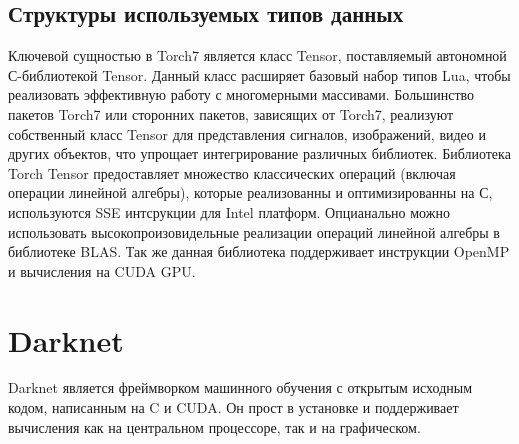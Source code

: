\documentclass[a4paper,english,russian]{G2-105}
\begin{document}
\subsection{Структуры используемых типов данных}
\par Ключевой сущностью в Torch7 является класс Tensor, поставляемый автономной С-библиотекой Tensor. Данный класс расширяет базовый набор типов Lua, чтобы реализовать эффективную работу с многомерными массивами. Большинство пакетов Torch7 или сторонних пакетов, зависящих от Torch7, реализуют собственный класс Tensor для представления сигналов, изображений, видео и других объектов, что упрощает интегрирование различных библиотек. Библиотека Torch Tensor предоставляет множество классических операций (включая операции линейной алгебры), которые реализованны и оптимизированны на С, используются SSE интсрукции для Intel платформ. Опцианально можно использовать высокопроизовидельные реализации операций линейной алгебры в библиотеке BLAS. Так же данная библиотека поддерживает инструкции OpenMP и вычисления на CUDA GPU.
\ttl
\section{Darknet}
Darknet является фреймворком машинного обучения с открытым исходным кодом, написанным на C и CUDA. Он прост в установке и поддерживает вычисления как на центральном процессоре, так и на графическом.
\ttl
\end{document}
